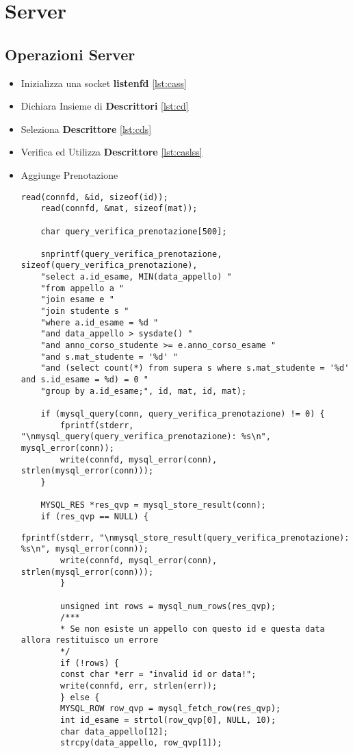 \newpage
\section{Server}
\subsection{Operazioni Server}
\begin{itemize}
	\item Inizializza una socket \textbf{listenfd} \ref{lst:cass}
	\item Dichiara Insieme di \textbf{Descrittori} \ref{lst:cd}
	\item Seleziona \textbf{Descrittore} \ref{lst:cds}
	\item Verifica ed Utilizza \textbf{Descrittore} \ref{lst:caslss}
	\item Aggiunge Prenotazione 
	\begin{lstlisting}[caption=Codice Query Aggiungi Prenotazione, label=lst:cqap-1]
	read(connfd, &id, sizeof(id));
	read(connfd, &mat, sizeof(mat));
	
	char query_verifica_prenotazione[500];
	
	snprintf(query_verifica_prenotazione, sizeof(query_verifica_prenotazione),
	"select a.id_esame, MIN(data_appello) "
	"from appello a "
	"join esame e "
	"join studente s "
	"where a.id_esame = %d "
	"and data_appello > sysdate() "
	"and anno_corso_studente >= e.anno_corso_esame "
	"and s.mat_studente = '%d' "
	"and (select count(*) from supera s where s.mat_studente = '%d' and s.id_esame = %d) = 0 "
	"group by a.id_esame;", id, mat, id, mat);
	
	if (mysql_query(conn, query_verifica_prenotazione) != 0) {
		fprintf(stderr, "\nmysql_query(query_verifica_prenotazione): %s\n", mysql_error(conn));
		write(connfd, mysql_error(conn), strlen(mysql_error(conn)));
	}
	
	MYSQL_RES *res_qvp = mysql_store_result(conn);
	if (res_qvp == NULL) {		
	\end{lstlisting}
	\begin{lstlisting}[caption=Codice Query Aggiungi Prenotazione, label=lst:cqap-2]
		fprintf(stderr, "\nmysql_store_result(query_verifica_prenotazione): %s\n", mysql_error(conn));
		write(connfd, mysql_error(conn), strlen(mysql_error(conn)));
		}
		
		unsigned int rows = mysql_num_rows(res_qvp);
		/***
		* Se non esiste un appello con questo id e questa data allora restituisco un errore
		*/
		if (!rows) {
		const char *err = "invalid id or data!";
		write(connfd, err, strlen(err));
		} else {
		MYSQL_ROW row_qvp = mysql_fetch_row(res_qvp);
		int id_esame = strtol(row_qvp[0], NULL, 10);
		char data_appello[12];
		strcpy(data_appello, row_qvp[1]);
		

\end{lstlisting}
\end{itemize}
